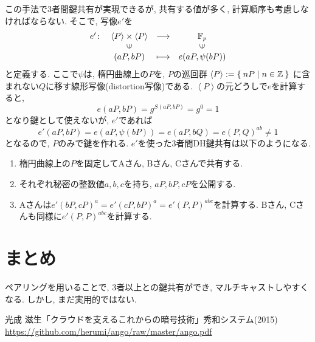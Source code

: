 \documentclass[a4paper,11pt]{jsarticle}
\begin{document}
この手法で3者間鍵共有が実現できるが, 共有する値が多く, 
計算順序も考慮しなければならない.
そこで, 写像$e'$を
\[
  \begin{array}{rccc}
    e' \colon & \left<P\right> \times \left<P\right> & \longrightarrow & \mathbb{F}_p \\
      & \rotatebox{90}{$\in$} & & \rotatebox{90}{$\in$} \\
      & (aP, bP) & \longmapsto & e(aP, \psi(bP))
  \end{array}
\]
と定義する.
ここで$\psi$は, 楕円曲線上の$P$を, $P$の巡回群
$\left<P\right> := \Set{nP | n \in \mathbb{Z}}$
に含まれない$Q$に移す線形写像(distortion写像)である.
$\left<P\right>$の元どうしで$e$を計算すると, 
\[
  e(aP, bP) = g^{S(aP, bP)} = g^0 = 1
\]
となり鍵として使えないが, $e'$であれば
\[
  e'(aP, bP) = e(aP, \psi(bP)) = e(aP, bQ) = e(P, Q)^{ab} \neq 1
\]
となるので, $P$のみで鍵を作れる.
$e'$を使った3者間DH鍵共有は以下のようになる.
\begin{enumerate}
  \item 楕円曲線上の$P$を固定してAさん, Bさん, Cさんで共有する.
  \item それぞれ秘密の整数値$a, b, c$を持ち, $aP, bP, cP$を公開する.
  \item Aさんは$e'(bP, cP)^a = e'(cP, bP)^a = e'(P, P)^{abc}$を計算する.
    Bさん, Cさんも同様に$e'(P, P)^{abc}$を計算する.
\end{enumerate}

\section{まとめ}
ペアリングを用いることで, 3者以上との鍵共有ができ,
マルチキャストしやすくなる.
しかし, まだ実用的ではない.

\begin{thebibliography}{99}
  光成 滋生「クラウドを支えるこれからの暗号技術」秀和システム(2015) \url{https://github.com/herumi/ango/raw/master/ango.pdf}
\end{thebibliography}
\end{document}
